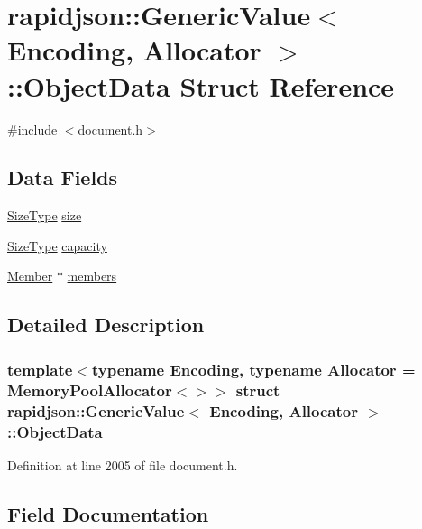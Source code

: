 \hypertarget{structrapidjson_1_1_generic_value_1_1_object_data}{}\section{rapidjson\+::Generic\+Value$<$ Encoding, Allocator $>$\+::Object\+Data Struct Reference}
\label{structrapidjson_1_1_generic_value_1_1_object_data}


{\ttfamily \#include $<$document.\+h$>$}

\subsection*{Data Fields}
\begin{DoxyCompactItemize}
\item 
\mbox{\hyperlink{namespacerapidjson_a44eb33eaa523e36d466b1ced64b85c84}{Size\+Type}} \mbox{\hyperlink{structrapidjson_1_1_generic_value_1_1_object_data_ae01f535401624121d8180b5615f17c1d}{size}}
\item 
\mbox{\hyperlink{namespacerapidjson_a44eb33eaa523e36d466b1ced64b85c84}{Size\+Type}} \mbox{\hyperlink{structrapidjson_1_1_generic_value_1_1_object_data_af7d0d82d23bebb85e425a7fd527463e4}{capacity}}
\item 
\mbox{\hyperlink{classrapidjson_1_1_generic_value_a0220ddebe2f023fa75b643a50e90e559}{Member}} $\ast$ \mbox{\hyperlink{structrapidjson_1_1_generic_value_1_1_object_data_a9b9052818979866b380571d59c8178af}{members}}
\end{DoxyCompactItemize}


\subsection{Detailed Description}
\subsubsection*{template$<$typename Encoding, typename Allocator = Memory\+Pool\+Allocator$<$$>$$>$\newline
struct rapidjson\+::\+Generic\+Value$<$ Encoding, Allocator $>$\+::\+Object\+Data}



Definition at line 2005 of file document.\+h.



\subsection{Field Documentation}
\mbox{\label{structrapidjson_1_1_generic_value_1_1_object_data_af7d0d82d23bebb85e425a7fd527463e4}} 
